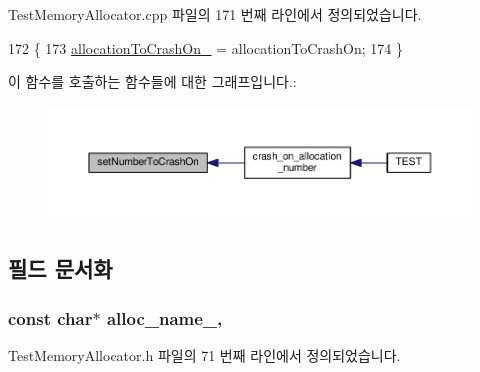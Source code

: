 Test\+Memory\+Allocator.\+cpp 파일의 171 번째 라인에서 정의되었습니다.


\begin{DoxyCode}
172 \{
173     \hyperlink{class_crash_on_allocation_allocator_af8165a9bc21b924230ab532b1f65d90f}{allocationToCrashOn\_} = allocationToCrashOn;
174 \}
\end{DoxyCode}


이 함수를 호출하는 함수들에 대한 그래프입니다.\+:
\nopagebreak
\begin{figure}[H]
\begin{center}
\leavevmode
\includegraphics[width=350pt]{class_crash_on_allocation_allocator_a58b38fa14a916934ff8664d04e725011_icgraph}
\end{center}
\end{figure}




\subsection{필드 문서화}
\subsubsection[{\texorpdfstring{alloc\+\_\+name\+\_\+}{alloc_name_}}]{\setlength{\rightskip}{0pt plus 5cm}const char$\ast$ alloc\+\_\+name\+\_\+\hspace{0.3cm}{\ttfamily [protected]}, {\ttfamily [inherited]}}\hypertarget{class_test_memory_allocator_ae5a98ff3b709da10db95a0ed03362548}{}\label{class_test_memory_allocator_ae5a98ff3b709da10db95a0ed03362548}


Test\+Memory\+Allocator.\+h 파일의 71 번째 라인에서 정의되었습니다.


